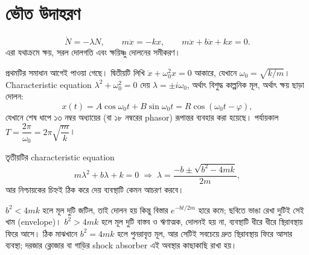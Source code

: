 \documentclass[11pt]{article}
\begin{document}
\section{ভৌত উদাহরণ}

\begin{idea}[তিনটি চেনা সমীকরণ]
\[
  \dot{N} = -\lambda N, \qquad
  m\ddot{x} = -kx, \qquad
  m\ddot{x} + b\dot{x} + kx = 0 .
\]
এরা যথাক্রমে ক্ষয়, সরল দোলগতি এবং ক্ষয়িষ্ণু দোলনের সমীকরণ।
\end{idea}

প্রথমটির সমাধান আগেই পাওয়া গেছে। দ্বিতীয়টি লিখি
$\ddot{x} + \omega_{0}^{2}x = 0$ আকারে, যেখানে
$\omega_{0} = \sqrt{k/m}$। Characteristic equation
$\lambda^{2} + \omega_{0}^{2} = 0$ দেয় $\lambda = \pm i\omega_{0}$, অর্থাৎ
বিশুদ্ধ কাল্পনিক মূল, অর্থাৎ ক্ষয় ছাড়া দোলন:
\[
  x(t) = A\cos\omega_{0}t + B\sin\omega_{0}t
       = R\cos\left( \omega_{0}t - \varphi \right) ,
\]
যেখানে শেষ ধাপে ১৩ নম্বর অধ্যায়ের (বা ১৮ নম্বরের phasor) রূপান্তর ব্যবহার
করা হয়েছে। পর্যায়কাল $T = \dfrac{2\pi}{\omega_{0}} = 2\pi\sqrt{\dfrac{m}{k}}$।

তৃতীয়টির characteristic equation
\[
  m\lambda^{2} + b\lambda + k = 0
  \;\Longrightarrow\;
  \lambda = \frac{-b \pm \sqrt{b^{2}-4mk}}{2m} ,
\]
আর নিশ্চায়কের চিহ্নই ঠিক করে দেয় ব্যবস্থাটি কেমন আচরণ করবে।

\begin{center}
\end{center}

$b^{2} < 4mk$ হলে মূল দুটি জটিল, তাই দোলন হয় কিন্তু বিস্তার $e^{-bt/2m}$
হারে কমে; ছবিতে ভাঙা রেখা দুটিই সেই খাম (envelope)। $b^{2} > 4mk$ হলে মূল দুটি বাস্তব ও
ঋণাত্মক, দোলনই হয় না, ব্যবস্থাটি ধীরে ধীরে স্থিরাবস্থায় ফিরে আসে। ঠিক মাঝখানে
$b^{2} = 4mk$ হলে পুনরাবৃত্ত মূল, আর সেটিই সবচেয়ে দ্রুত স্থিরাবস্থায় ফিরে আসার ব্যবস্থা;
দরজার ক্লোজার বা গাড়ির shock absorber এই অবস্থার কাছাকাছি রাখা হয়।
\end{document}
